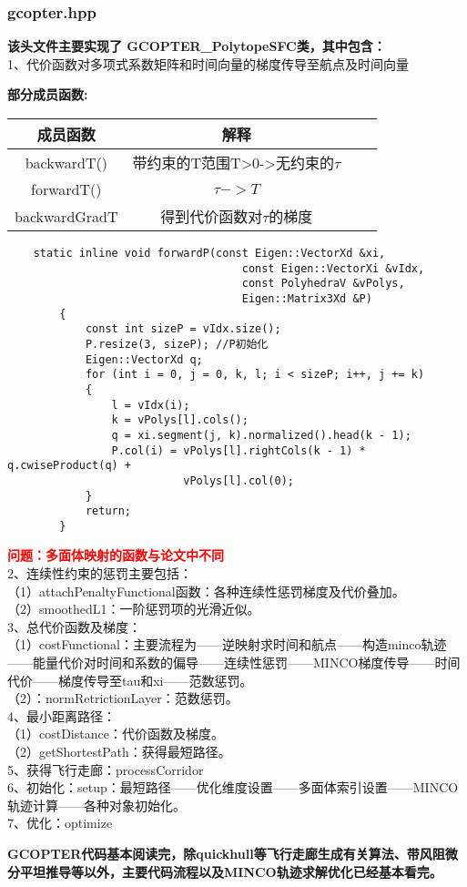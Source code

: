 \subsubsection{gcopter.hpp}
\textbf{该头文件主要实现了 GCOPTER\_PolytopeSFC类，其中包含：}\\
1、代价函数对多项式系数矩阵和时间向量的梯度传导至航点及时间向量

\begin{tcolorbox}[red]
    \textbf{部分成员函数:}\\
    \begin{tabular}{cccc}
        \toprule
        成员函数 & 解释  \\
        \midrule
        backwardT() & 带约束的T范围T>0->无约束的$\tau$\\
        forwardT() & $\tau -> T $\\
        backwardGradT & 得到代价函数对$\tau$的梯度\\
        \bottomrule
    \end{tabular}
\end{tcolorbox}


\begin{lstlisting}
    static inline void forwardP(const Eigen::VectorXd &xi,      
                                    const Eigen::VectorXi &vIdx,  
                                    const PolyhedraV &vPolys,       
                                    Eigen::Matrix3Xd &P)        
        {
            const int sizeP = vIdx.size();  
            P.resize(3, sizeP); //P初始化
            Eigen::VectorXd q;  
            for (int i = 0, j = 0, k, l; i < sizeP; i++, j += k)
            {
                l = vIdx(i);
                k = vPolys[l].cols(); 
                q = xi.segment(j, k).normalized().head(k - 1);
                P.col(i) = vPolys[l].rightCols(k - 1) * q.cwiseProduct(q) +
                           vPolys[l].col(0);
            }
            return;
        }
\end{lstlisting}
\textcolor{red}{\textbf{问题：多面体映射的函数与论文中不同}}\\
2、连续性约束的惩罚主要包括：\\
（1）attachPenaltyFunctional函数：各种连续性惩罚梯度及代价叠加。\\
（2）smoothedL1：一阶惩罚项的光滑近似。\\
3、总代价函数及梯度：\\
（1）costFunctional：主要流程为——逆映射求时间和航点——构造minco轨迹
——能量代价对时间和系数的偏导——连续性惩罚——MINCO梯度传导——时间代价——梯度传导至tau和xi——范数惩罚。\\
（2）：normRetrictionLayer：范数惩罚。\\
4、最小距离路径：\\
（1）costDistance：代价函数及梯度。\\
（2）getShortestPath：获得最短路径。\\
5、获得飞行走廊：processCorridor\\
6、初始化：setup：最短路径——优化维度设置——多面体索引设置——MINCO轨迹计算——各种对象初始化。\\
7、优化：optimize\\


\begin{tcolorbox}[blue]
\textbf{GCOPTER代码基本阅读完，除quickhull等飞行走廊生成有关算法、带风阻微分平坦推导等以外，主要代码流程以及MINCO轨迹求解优化已经基本看完。}
\end{tcolorbox}

